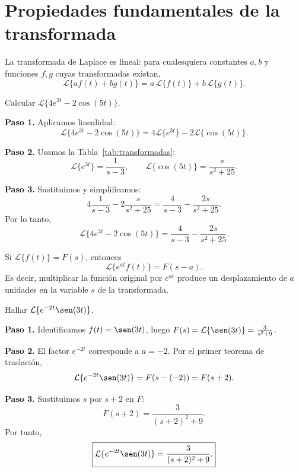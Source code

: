\section{Propiedades fundamentales de la transformada}

\begin{theorem}[Linealidad]
La transformada de Laplace es lineal: para cualesquiera constantes $a,b$ y funciones $f,g$ cuyas transformadas existan,
\[
\mathcal{L}\{a f(t) + b g(t)\} = a\,\mathcal{L}\{f(t)\} + b\,\mathcal{L}\{g(t)\}.
\]
\end{theorem}

\begin{example}
Calcular $\mathcal{L}\{4e^{3t} - 2\cos(5t)\}$.
\begin{myproof}
\textbf{Paso 1.} Aplicamos linealidad:
\[
\mathcal{L}\{4e^{3t} - 2\cos(5t)\} = 4\mathcal{L}\{e^{3t}\} - 2\mathcal{L}\{\cos(5t)\}.
\]

\textbf{Paso 2.} Usamos la Tabla~\ref{tab:transformadas}:
\[
\mathcal{L}\{e^{3t}\} = \frac{1}{s-3},\qquad \mathcal{L}\{\cos(5t)\} = \frac{s}{s^2+25}.
\]

\textbf{Paso 3.} Sustituimos y simplificamos:
\[
4\frac{1}{s-3} - 2\frac{s}{s^2+25} = \frac{4}{s-3} - \frac{2s}{s^2+25}.
\]
Por lo tanto,
\[
\boxed{\mathcal{L}\{4e^{3t} - 2\cos(5t)\} = \frac{4}{s-3} - \frac{2s}{s^2+25}.}
\]
\end{myproof}
\end{example}

\begin{theorem}
Si $\mathcal{L}\{f(t)\}=F(s)$, entonces
\[
\mathcal{L}\{e^{at} f(t)\} = F(s-a).
\]
Es decir, multiplicar la función original por $e^{at}$ produce un desplazamiento de $a$ unidades en la variable $s$ de la transformada.
\end{theorem}

\begin{example}
Hallar $\mathcal{L}\{e^{-2t}\sen(3t)\}$.
\begin{myproof}
\textbf{Paso 1.} Identificamos $f(t)=\sen(3t)$, luego $F(s)=\mathcal{L}\{\sen(3t)\} = \frac{3}{s^2+9}$.

\textbf{Paso 2.} El factor $e^{-2t}$ corresponde a $a=-2$. Por el primer teorema de traslación,
\[
\mathcal{L}\{e^{-2t}\sen(3t)\} = F(s-(-2)) = F(s+2).
\]

\textbf{Paso 3.} Sustituimos $s$ por $s+2$ en $F$:
\[
F(s+2) = \frac{3}{(s+2)^2+9}.
\]
Por tanto,
\[
\boxed{\mathcal{L}\{e^{-2t}\sen(3t)\} = \frac{3}{(s+2)^2+9}.}
\]
\end{myproof}
\end{example}

